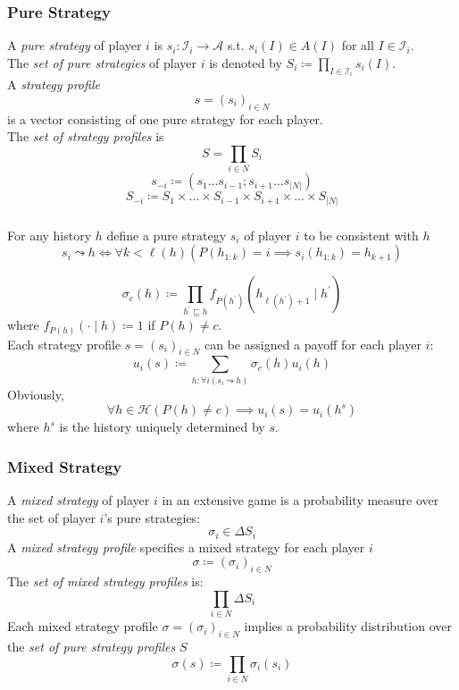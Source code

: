 \documentclass[UTF8,11pt,colorlinks,compress,openany]{beamer}%
\begin{document}
\begin{frame}\frametitle{Pure Strategy}
\begin{definition}
	A \emph{pure strategy} of player $i$ is $s_i: \mathcal{I}_i\to \mathcal{A}$ s.t. $s_i(I)\in A(I)$ for all $I\in\mathcal{I}_i$.\\
	The \emph{set of pure strategies} of player $i$ is denoted by $S_i\coloneqq \prod\limits_{I\in\mathcal{I}_i}s_i(I)$.\\
	A \emph{strategy profile} \[s=(s_i)_{i\in N}\] is a vector consisting of one pure strategy for each player.\\
	The \emph{set of strategy profiles} is \[S=\prod\limits_{i\in N} S_i\]
	\[s_{-i}\coloneqq (s_1\ldots s_{i-1};s_{i+1}\ldots s_{|N|})\]
	\[S_{-i}\coloneqq S_1\times\ldots\times S_{i-1}\times S_{i+1}\times\ldots\times S_{|N|}\]
\end{definition}
\end{frame}

\begin{frame}\frametitle{}
\begin{definition}
	For any history $h$ define a pure strategy $s_i$ of player $i$ to be consistent with $h$
	\[s_i\leadsto h\iff\forall k<\ell(h)\left(P(h_{1:k})=i\implies s_i(h_{1:k})=h_{k+1}\right)\]
\end{definition}
\[\sigma_c(h)\coloneqq \prod\limits_{h^\prime\sqsubseteq h}f_{P(h^\prime)}(h_{\ell(h^\prime)+1}\mid h^\prime)\]
where $f_{P(h)}(\cdot\mid h)\coloneqq 1$ if $P(h)\neq c$.\\
Each strategy profile $s=(s_i)_{i\in N}$ can be assigned a payoff for each player $i$:
\[u_i(s)\coloneqq \sum\limits_{h: \forall i(s_i\leadsto h)}\sigma_c(h)u_i(h)\]
Obviously, \[\forall h\in\mathcal{H}\left(P(h)\neq c\right)\implies u_i(s)=u_i(h^s)\] where $h^s$ is the history uniquely determined by $s$.
\end{frame}

\begin{frame}\frametitle{Mixed Strategy}
\setlength\abovedisplayskip{0pt}
\begin{definition}
	A \emph{mixed strategy} of player $i$ in an extensive game is a probability measure over the set of player $i$'s pure strategies:
	\[\sigma_i\in\Delta S_i\]
	A \emph{mixed strategy profile} specifies a mixed strategy for each	player $i$
	\[\sigma\coloneqq (\sigma_i)_{i\in N}\]
	The \emph{set of mixed strategy profiles} is:
	\[\prod\limits_{i\in N}\Delta S_i\]
	Each mixed strategy profile $\sigma=(\sigma_i)_{i\in N}$ implies a probability distribution
	over the \emph{set of pure strategy profiles} $S$
	\[\sigma(s)\coloneqq \prod\limits_{i\in N} \sigma_i(s_i)\]
\end{definition}
\end{frame}
\end{document}
